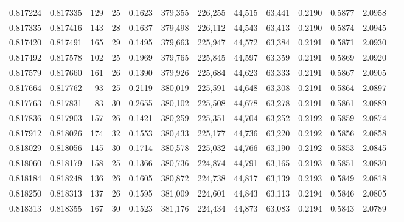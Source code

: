 \begin{tabular}{rrrrrrrrrrrrr}
0.817224 & 0.817335 &   129 &  25 &                                     0.1623 & 379,355 & 226,255 &  44,515 &  63,441 & 0.2190 & 0.5877 & 2.0958 \\
0.817335 & 0.817416 &   143 &  28 &                                     0.1637 & 379,498 & 226,112 &  44,543 &  63,413 & 0.2190 & 0.5874 & 2.0945 \\
0.817420 & 0.817491 &   165 &  29 &                                     0.1495 & 379,663 & 225,947 &  44,572 &  63,384 & 0.2191 & 0.5871 & 2.0930 \\
0.817492 & 0.817578 &   102 &  25 &                                     0.1969 & 379,765 & 225,845 &  44,597 &  63,359 & 0.2191 & 0.5869 & 2.0920 \\
0.817579 & 0.817660 &   161 &  26 &                                     0.1390 & 379,926 & 225,684 &  44,623 &  63,333 & 0.2191 & 0.5867 & 2.0905 \\
0.817664 & 0.817762 &    93 &  25 &                                     0.2119 & 380,019 & 225,591 &  44,648 &  63,308 & 0.2191 & 0.5864 & 2.0897 \\
0.817763 & 0.817831 &    83 &  30 &                                     0.2655 & 380,102 & 225,508 &  44,678 &  63,278 & 0.2191 & 0.5861 & 2.0889 \\
0.817836 & 0.817903 &   157 &  26 &                                     0.1421 & 380,259 & 225,351 &  44,704 &  63,252 & 0.2192 & 0.5859 & 2.0874 \\
0.817912 & 0.818026 &   174 &  32 &                                     0.1553 & 380,433 & 225,177 &  44,736 &  63,220 & 0.2192 & 0.5856 & 2.0858 \\
0.818029 & 0.818056 &   145 &  30 &                                     0.1714 & 380,578 & 225,032 &  44,766 &  63,190 & 0.2192 & 0.5853 & 2.0845 \\
0.818060 & 0.818179 &   158 &  25 &                                     0.1366 & 380,736 & 224,874 &  44,791 &  63,165 & 0.2193 & 0.5851 & 2.0830 \\
0.818184 & 0.818248 &   136 &  26 &                                     0.1605 & 380,872 & 224,738 &  44,817 &  63,139 & 0.2193 & 0.5849 & 2.0818 \\
0.818250 & 0.818313 &   137 &  26 &                                     0.1595 & 381,009 & 224,601 &  44,843 &  63,113 & 0.2194 & 0.5846 & 2.0805 \\
0.818313 & 0.818355 &   167 &  30 &                                     0.1523 & 381,176 & 224,434 &  44,873 &  63,083 & 0.2194 & 0.5843 & 2.0789 \\

\end{tabular}
